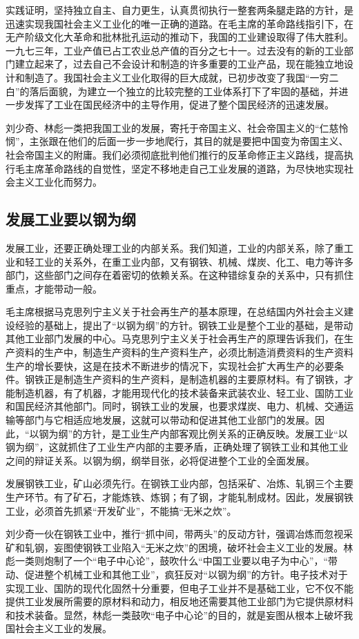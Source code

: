 \documentclass{book}
\begin{document}
实践证明，坚持独立自主、自力更生，认真贯彻执行一整套两条腿走路的方针，是迅速实现我国社会主义工业化的唯一正确的道路。在毛主席的革命路线指引下，在无产阶级文化大革命和批林批孔运动的推动下，我国的工业建设取得了伟大胜利。一九七三年，工业产值已占工农业总产值的百分之七十一。过去没有的新的工业部门建立起来了，过去自己不会设计和制造的许多重要的工业产品，现在能独立地设计和制造了。我国社会主义工业化取得的巨大成就，已初步改变了我国“一穷二白”的落后面貌，为建立一个独立的比较完整的工业体系打下了牢固的基础，并进一步发挥了工业在国民经济中的主导作用，促进了整个国民经济的迅速发展。

刘少奇、林彪一类把我国工业的发展，寄托于帝国主义、社会帝国主义的“仁慈怜悯”，主张跟在他们的后面一步一步地爬行，其目的就是要把中国变为帝国主义、社会帝国主义的附庸。我们必须彻底批判他们推行的反革命修正主义路线，提高执行毛主席革命路线的自觉性，坚定不移地走自己工业发展的道路，为尽快地实现社会主义工业化而努力。

\subsection{发展工业要以钢为纲}

发展工业，还要正确处理工业的内部关系。我们知道，工业的内部关系，除了重工业和轻工业的关系外，在重工业内部，又有钢铁、机械、煤炭、化工、电力等许多部门，这些部门之间存在着密切的依赖关系。在这种错综复杂的关系中，只有抓住重点，才能带动一般。

毛主席根据马克思列宁主义关于社会再生产的基本原理，在总结国内外社会主义建设经验的基础上，提出了“以钢为纲”的方针。钢铁工业是整个工业的基础，是带动其他工业部门发展的中心。马克思列宁主义关于社会再生产的原理告诉我们，在生产资料的生产中，制造生产资料的生产资料生产，必须比制造消费资料的生产资料生产的增长要快，这是在技术不断进步的情况下，实现社会扩大再生产的必要条件。钢铁正是制造生产资料的生产资料，是制造机器的主要原材料。有了钢铁，才能制造机器，有了机器，才能用现代化的技术装备来武装农业、轻工业、国防工业和国民经济其他部门。同时，钢铁工业的发展，也要求煤炭、电力、机械、交通运输等部门与它相适应地发展，这就可以带动和促进其他工业部门的发展。因此，“以钢为纲”的方针，是工业生产内部客观比例关系的正确反映。发展工业“以钢为纲”，这就抓住了工业生产内部的主要矛盾，正确处理了钢铁工业和其他工业之间的辩证关系。以钢为纲，纲举目张，必将促进整个工业的全面发展。

发展钢铁工业，矿山必须先行。在钢铁工业内部，包括采矿、冶炼、轧钢三个主要生产环节。有了矿石，才能炼铁、炼钢；有了钢，才能轧制成材。因此，发展钢铁工业，必须首先抓紧“开发矿业”，不能搞“无米之炊”。

刘少奇一伙在钢铁工业中，推行“抓中间，带两头”的反动方针，强调冶炼而忽视采矿和轧钢，妄图使钢铁工业陷入“无米之炊”的困境，破坏社会主义工业的发展。林彪一类则炮制了一个“电子中心论”，鼓吹什么“中国工业要以电子为中心”，“带动、促进整个机械工业和其他工业”，疯狂反对“以钢为纲”的方针。电子技术对于实现工业、国防的现代化固然十分重要，但电子工业并不是基础工业，它不仅不能提供工业发展所需要的原材料和动力，相反地还需要其他工业部门为它提供原材料和技术装备。显然，林彪一类鼓吹“电子中心论”的目的，就是妄图从根本上破坏我国社会主义工业的发展。
\end{document}
